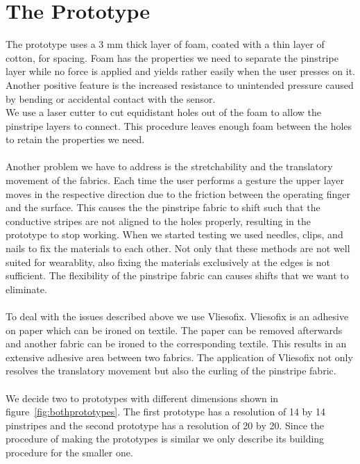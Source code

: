 \section{The Prototype}

The prototype uses a 3 mm thick layer of foam, coated with a thin layer of cotton, for spacing. Foam has the properties we need to separate the pinstripe layer while no force is applied and yields rather easily when the user presses on it. Another positive feature is the increased resistance to unintended pressure caused by bending or accidental contact with the sensor.
\\
We use a laser cutter to cut equidistant holes out of the foam to allow the pinstripe layers to connect. This procedure leaves enough foam between the holes to retain the properties we need. \\ \\
Another problem we have to address is the stretchability and the translatory movement of the fabrics. Each time the user performs a gesture the upper layer moves in the respective direction due to the friction between the operating finger and the surface. This causes the the pinstripe fabric to shift such that the conductive stripes are not aligned to the holes properly, resulting in the prototype to stop working. When we started testing we used needles, clips, and nails to fix the materials to each other. Not only that these methods are not well suited for wearablity, also fixing the materials exclusively at the edges is not sufficient.  The flexibility of the pinstripe fabric can causes shifts that we want to eliminate. 
\\ \\
 To deal with the issues described above we use Vliesofix. Vliesofix is an adhesive on paper which can be ironed on textile. The paper can be removed afterwards and another fabric can be ironed to the corresponding textile. This results in an extensive adhesive area between two fabrics. The application of Vliesofix not only resolves the translatory movement but also the curling of the pinstripe fabric.
\\ \\
We decide two to prototypes with different dimensions shown in figure~\ref{fig:bothprototypes}. The first prototype has a resolution of 14 by 14 pinstripes and the second prototype has a resolution of 20 by 20. Since the procedure of making the prototypes is similar we only describe its building procedure for the smaller one. 
